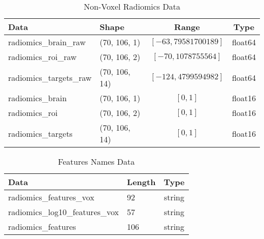 \begin{table}[H]
\centering
\begin{tabular}{|l|l|c|c|}
\hline
\textbf{Data} & \textbf{Shape} & \textbf{Range} & \textbf{Type} \\ \hline
radiomics\_brain\_raw & (70, 106, 1) & $[-63,79581700189]$ & float64 \\ \hline
radiomics\_roi\_raw & (70, 106, 2) & $[-70,1078755564]$ & float64 \\ \hline
radiomics\_targets\_raw & (70, 106, 14) & $[-124,4799594982]$ & float64 \\ \hline
radiomics\_brain & (70, 106, 1) & $[0,1]$ & float16 \\ \hline
radiomics\_roi & (70, 106, 2) & $[0,1]$ & float16 \\ \hline
radiomics\_targets & (70, 106, 14) & $[0,1]$ & float16 \\ \hline
\end{tabular}
\caption{Non-Voxel Radiomics Data}
\label{tab:datasrad}
\end{table}

\begin{table}[H]
\centering
\begin{tabular}{|l|l|c|}
\hline
\textbf{Data} & \textbf{Length} & \textbf{Type} \\ \hline
radiomics\_features\_vox & 92 & string \\ \hline
radiomics\_log10\_features\_vox & 57 & string \\ \hline
radiomics\_features & 106 & string \\ \hline
\end{tabular}
\caption{Features Names Data}
\label{tab:datasfea}
\end{table}






